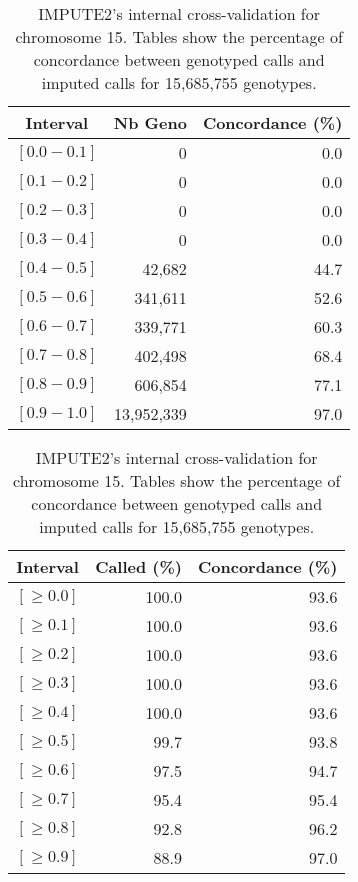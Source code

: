 \documentclass[10pt,twoside,english]{scrartcl}
\begin{document}
\begin{table}[H]
\protect\caption{IMPUTE2's internal cross-validation for chromosome 15. Tables show the
percentage of concordance between genotyped calls and imputed calls
for 15,685,755 genotypes.\label{tab:cross_validation_chr_15}}

\centering

\begin{tabular}{crr}
\hline 
\multicolumn{1}{c}{\textbf{Interval}}
 & \multicolumn{1}{c}{\textbf{Nb Geno}}
 & \multicolumn{1}{c}{\textbf{Concordance (\%)}}
\\
\hline 

$[0.0-0.1]$ & 0 & 0.0\\
$[0.1-0.2]$ & 0 & 0.0\\
$[0.2-0.3]$ & 0 & 0.0\\
$[0.3-0.4]$ & 0 & 0.0\\
$[0.4-0.5]$ & 42,682 & 44.7\\
$[0.5-0.6]$ & 341,611 & 52.6\\
$[0.6-0.7]$ & 339,771 & 60.3\\
$[0.7-0.8]$ & 402,498 & 68.4\\
$[0.8-0.9]$ & 606,854 & 77.1\\
$[0.9-1.0]$ & 13,952,339 & 97.0\\
\hline 
\end{tabular}
\hfill
\begin{tabular}{crr}
\hline 
\multicolumn{1}{c}{\textbf{Interval}}
 & \multicolumn{1}{c}{\textbf{Called (\%)}}
 & \multicolumn{1}{c}{\textbf{Concordance (\%)}}
\\
\hline 

$[\geq 0.0]$ & 100.0 & 93.6\\
$[\geq 0.1]$ & 100.0 & 93.6\\
$[\geq 0.2]$ & 100.0 & 93.6\\
$[\geq 0.3]$ & 100.0 & 93.6\\
$[\geq 0.4]$ & 100.0 & 93.6\\
$[\geq 0.5]$ & 99.7 & 93.8\\
$[\geq 0.6]$ & 97.5 & 94.7\\
$[\geq 0.7]$ & 95.4 & 95.4\\
$[\geq 0.8]$ & 92.8 & 96.2\\
$[\geq 0.9]$ & 88.9 & 97.0\\
\hline 
\end{tabular}


\end{table}
\end{document}
